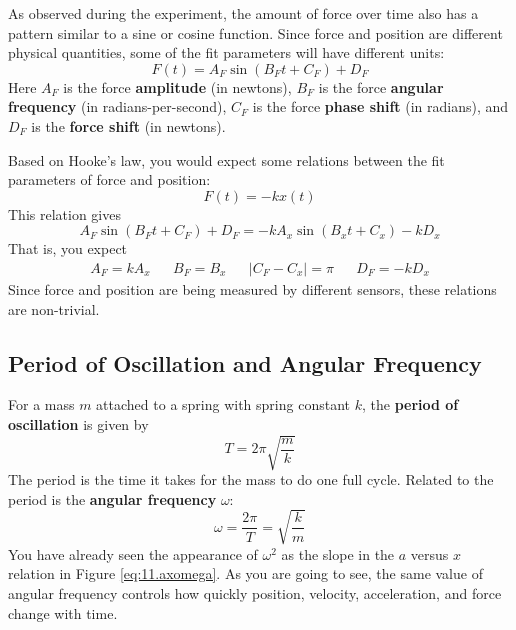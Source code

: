 As observed during the experiment, the amount of force over time also has a pattern similar to a sine or cosine function. Since force and position are different physical quantities, some of the fit parameters will have different units:
\begin{equation}
    F(t) = A_{F} \sin\left(B_{F} t + C_{F}\right) + D_{F}
\end{equation}
Here $A_{F}$ is the force \textbf{amplitude} (in newtons), $B_{F}$ is the force \textbf{angular frequency} (in radians-per-second), $C_{F}$ is the force \textbf{phase shift} (in radians), and $D_{F}$ is the \textbf{force shift} (in newtons).

Based on Hooke's law, you would expect some relations between the fit parameters of force and position:
\begin{equation}
    F(t) = - k x(t)
\end{equation}
This relation gives
\begin{equation}
    A_{F} \sin\left(B_{F} t + C_{F}\right) + D_{F} = -k A_{x} \sin\left( B_{x}t + C_{x} \right) - kD_{x}
\end{equation}
That is, you expect
\begin{align}
    A_{F} = kA_{x} && B_{F} = B_{x} && \vert C_{F} - C_{x} \vert = \pi && D_{F} = -kD_{x}
\end{align}
Since force and position are being measured by different sensors, these relations are non-trivial.
\subsection{Period of Oscillation and Angular Frequency}
For a mass $m$ attached to a spring with spring constant $k$, the \textbf{period of oscillation} is given by
\begin{equation}
    T = 2\pi \sqrt{\frac{m}{k}}
\end{equation}
The period is the time it takes for the mass to do one full cycle. Related to the period is the \textbf{angular frequency} $\omega$:
\begin{equation}
    \omega = \frac{2 \pi}{T} = \sqrt{\frac{k}{m}}
    \label{eq.11.omega}
\end{equation}
You have already seen the appearance of $\omega^{2}$ as the slope in the $a$ versus $x$ relation in Figure \ref{eq:11.axomega}. As you are going to see, the same value of angular frequency controls how quickly position, velocity, acceleration, and force change with time.
